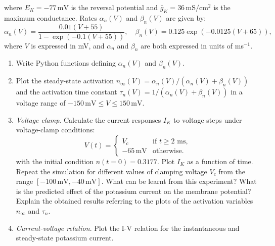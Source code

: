 \documentclass[12pt]{article}
\begin{document}
\begin{enumerate}
    where $E_K=-77\,\mathrm{mV}$ is the reversal potential and
    $\bar{g}_K=36\,\mathrm{mS/cm^2}$ is the maximum conductance. Rates
    $\alpha_n(V)$ and $\beta_n(V)$ are given by:
    \begin{equation}
        \alpha_n(V)=\frac{0.01(V+55)}{1-\exp(-0.1(V+55))},\quad
        \beta_n(V)=0.125\exp(-0.0125(V+65)),
    \end{equation}
    where $V$ is expressed in mV, and $\alpha_n$ and $\beta_n$ are both
    expressed in units of ms$^{-1}$.
    \begin{enumerate}
        \item Write Python functions defining $\alpha_n(V)$ and $\beta_n(V)$.
        \item \label{ex:stedy-state} Plot the steady-state activation
            $n_\infty(V)=\alpha_n(V)/(\alpha_n(V)+\beta_n(V))$ and the
            activation time constant $\tau_n(V)=1/(\alpha_n(V)+\beta_n(V))$ in
            a voltage range of $-150\,\mathrm{mV}\leq V \leq 150\,\mathrm{mV}$.
        \item \textit{Voltage clamp}. Calculate the current responses
            $I_K$ to voltage steps under voltage-clamp conditions:
            \begin{equation*}
                V(t)=
                \begin{cases} V_c & \text{if $t\geq2$ ms,} \\
                    -65\,\mathrm{mV} &\text{otherwise.}
                \end{cases}
            \end{equation*}
            with the initial condition $n(t=0)=0.3177$. Plot $I_K$ as a
            function of time. Repeat the simulation for different values of
            clamping voltage $V_c$ from the range  $[-100\,\mathrm{mV},
            -40\,\mathrm{mV}]$. What can be learnt from this experiment? What
            is the predicted effect of the potassium current on the membrane
            potential? Explain the obtained results referring to the plots of
            the activation variables $n_\infty$ and $\tau_n$.
        \item \textit{Current-voltage relation}. Plot the I-V relation for
            the instantaneous and steady-state potassium
            current.
    \end{enumerate}



\end{enumerate}
\end{document}

